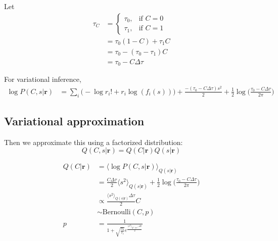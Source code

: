 \documentclass[12pt]{article}
\begin{document}
Let 
\begin{equation}
\begin{aligned}
\tau_C &= \begin{cases}
\tau_0, & \text{if } C = 0\\
\tau_1, & \text{if } C = 1
\end{cases}\\
&= \tau_0 (1 - C) + \tau_1 C\\
&= \tau_0 - (\tau_0 - \tau_1)C\\
&= \tau_0 - C \Delta \tau
\end{aligned}
\end{equation}

For variational inference,
\begin{equation}
\begin{aligned}
\log P(C, s|\mathbf{r}) &= \sum_i \Big(- \log r_i! + r_i \log(f_i(s)) \Big) + \frac{-(\tau_0 - C \Delta \tau) s^2}{2} + \frac{1}{2} \log \Big(\frac{\tau_0 - C \Delta \tau}{2 \pi} \Big)
\end{aligned}
\end{equation}

\subsection{Variational approximation}
Then we approximate this using a factorized distribution:
\begin{equation}
Q(C, s|\mathbf{r}) = Q(C|\mathbf{r}) Q(s|\mathbf{r})
\end{equation}

\begin{equation}
\begin{aligned}
Q(C|\mathbf{r}) &= \langle \log P(C, s|\mathbf{r}) \rangle_{Q(s|\mathbf{r})}\\
&= \frac{C \Delta \tau}{2} \langle s^2 \rangle_{Q(s|\mathbf{r})} + \frac{1}{2} \log \Big(\frac{\tau_0 - C \Delta \tau}{2 \pi} \Big)\\
&\propto \frac{\langle s^2 \rangle_{Q(s|\mathbf{r})} \Delta \tau}{2} C\\
&\sim \text{Bernoulli}(C, p)\\
p &= \frac{1}{1 + \sqrt{\frac{\tau_0}{\tau_1}} e^{\frac{\langle s^2 \rangle_{Q(s|\mathbf{r})} \Delta \tau}{2}}}
\end{aligned}
\end{equation}
\end{document}
